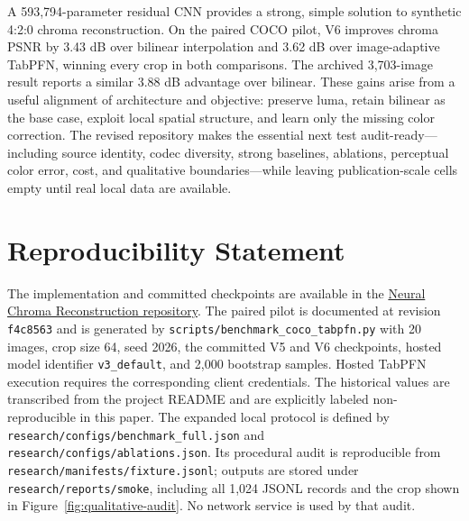 \documentclass[10pt,twocolumn]{article}
\newcommand{\model}{V6}
\newcommand{\code}[1]{\texttt{#1}}
\begin{document}
A 593,794-parameter residual CNN provides a strong, simple solution to synthetic
4:2:0 chroma reconstruction.  On the paired COCO pilot, \model{} improves chroma
PSNR by 3.43 dB over bilinear interpolation and 3.62 dB over image-adaptive
TabPFN, winning every crop in both comparisons.  The archived 3,703-image result
reports a similar 3.88 dB advantage over bilinear.  These gains arise from a
useful alignment of architecture and objective: preserve luma, retain bilinear as
the base case, exploit local spatial structure, and learn only the missing color
correction.  The revised repository makes the essential next test
audit-ready---including source identity, codec diversity, strong baselines,
ablations, perceptual color error, cost, and qualitative boundaries---while
leaving publication-scale cells empty until real local data are available.

\section*{Reproducibility Statement}

The implementation and committed checkpoints are available in the
\href{https://github.com/brunorios1080/neural-chroma-reconstruction}{Neural
Chroma Reconstruction repository}.
The paired pilot is documented at revision \code{f4c8563} and is generated by
\code{scripts/benchmark\_coco\_tabpfn.py} with 20 images, crop size 64, seed
2026, the committed V5 and V6 checkpoints, hosted model identifier
\code{v3\_default}, and 2,000 bootstrap samples.  Hosted TabPFN execution requires
the corresponding client credentials.  The historical values are transcribed
from the project README and are explicitly labeled non-reproducible in this
paper.  The expanded local protocol is defined by
\code{research/configs/benchmark\_full.json} and
\code{research/configs/ablations.json}.  Its procedural audit is reproducible
from \code{research/manifests/fixture.jsonl}; outputs are stored under
\code{research/reports/smoke}, including all 1,024 JSONL records and the crop shown
in Figure~\ref{fig:qualitative-audit}.  No network service is used by that audit.



\end{document}
